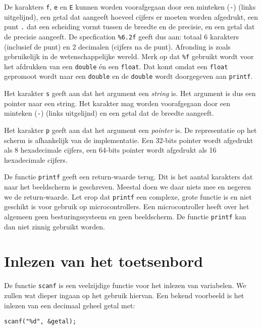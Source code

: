 De karakters \texttt{f}, \texttt{e} en \texttt{E} kunnen worden voorafgegaan door een minteken (\texttt{-}) (links uitgelijnd), een getal dat aangeeft hoeveel cijfers er moeten worden afgedrukt, een punt \texttt{\texttt{.}} dat een scheiding vormt tussen de breedte en de precisie, en een getal dat de precisie aangeeft. De specfication \texttt{\%6.2f} geeft dus aan: totaal 6 karakters (inclusief de punt) en 2 decimalen (cijfers na de punt). Afronding is zoals gebruikelijk in de wetenschappelijke wereld. Merk op dat \texttt{\%f} gebruikt wordt voor het afdrukken van een \texttt{double} én een \texttt{float}. Dat komt omdat een \texttt{float} gepromoot wordt naar een \texttt{double} en de \texttt{double} wordt doorgegeven aan \texttt{printf}.

Het karakter \texttt{s} geeft aan dat het argument een \textsl{string} is. Het argument is dus een pointer naar een string. Het karakter mag worden voorafgegaan door een minteken (\texttt{-}) (links uitgelijnd) en een getal dat de breedte aangeeft.

Het karakter \texttt{p} geeft aan dat het argument een \textsl{pointer} is. De representatie op het scherm is afhankelijk van de implementatie. Een 32-bits pointer wordt afgedrukt als 8 hexadecimale cijfers, een 64-bits pointer wordt afgedrukt als 16 hexadecimale cijfers.

De functie \texttt{printf} geeft een return-waarde terug. Dit is het aantal karakters dat naar het beeldscherm is geschreven. Meestal doen we daar niets mee en negeren we de return-waarde.
Let erop dat \texttt{printf} een complexe, grote functie is en niet geschikt is voor gebruik op microcontrollers. Een microcontroller heeft over het algemeen geen besturingssysteem en geen beeldscherm. De functie \texttt{printf} kan dan niet zinnig gebruikt worden.


\section{Inlezen van het toetsenbord}
\label{sec:scanf}
De functie \texttt{scanf} is een veelzijdige functie voor het inlezen van variabelen. We zullen wat dieper ingaan op het gebruik hiervan. Een bekend voorbeeld is het inlezen van een decimaal geheel getal met:

\begin{lstlisting}[style=lstoneline]
scanf("%d", &getal);
\end{lstlisting}

